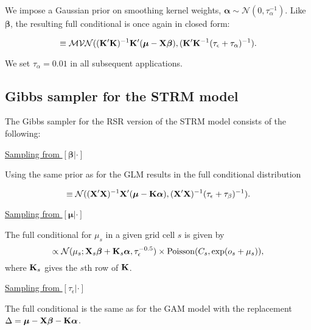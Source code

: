 \documentclass[12pt,fleqn]{article}
\begin{document}
\begin{flushleft}
We impose a Gaussian prior on smoothing kernel weights, $\boldsymbol{\alpha} \sim \mathcal{N}(0,\tau_\alpha^{-1})$.  Like $\boldsymbol{\beta}$, the resulting full conditional is once again in closed form:
\begin{linenomath*}
\begin{equation*}
   [\boldsymbol{\alpha} | \cdot] \equiv \mathcal{MVN}(({\bf K}^\prime {\bf K})^{-1}{\bf K}^\prime (\boldsymbol{\mu}-{\bf X}\boldsymbol{\beta}),({\bf K}^\prime {\bf K}^{-1} (\tau_\epsilon + \tau_\alpha)^{-1}).
\end{equation*}
\end{linenomath*}
We set $\tau_\alpha = 0.01$ in all subsequent applications.


\subsection{Gibbs sampler for the STRM model}

The Gibbs sampler for the RSR version of the STRM model consists of the following:

\underline{Sampling from $[\boldsymbol{\beta}|\cdot]$}

Using the same prior as for the GLM results in the full conditional distribution
\begin{linenomath*}
\begin{equation*}
   [\boldsymbol{\beta} | \cdot] \equiv \mathcal{N}(({\bf X}^\prime {\bf X})^{-1}{\bf X}^\prime (\boldsymbol{\mu}-{\bf K}\boldsymbol{\alpha}),({\bf X}^\prime {\bf X})^{-1} (\tau_\epsilon + \tau_\beta)^{-1}).
\end{equation*}
\end{linenomath*}

\underline{Sampling from $[\boldsymbol{\mu}|\cdot]$}

The full conditional for $\mu_s$ in a given grid cell $s$ is given by
\begin{equation*}
  [\mu_{s,t} | \cdot] \propto \mathcal{N}(\mu_s;{\bf X}_s \boldsymbol{\beta}+{\bf K}_s \boldsymbol{\alpha},\tau_\epsilon^{-0.5}) \times \textrm{Poisson}(C_s,\exp(o_s+\mu_s)),
\end{equation*}
where ${\bf K}_s$ gives the $s$th row of ${\bf K}$.

\underline{Sampling from $[\tau_\epsilon|\cdot]$}

The full conditional is the same as for the GAM model with the replacement $\Delta = \boldsymbol{\mu}-{\bf X}\boldsymbol{\beta}-{\bf K}\boldsymbol{\alpha}$.


\end{flushleft}
\end{document}

